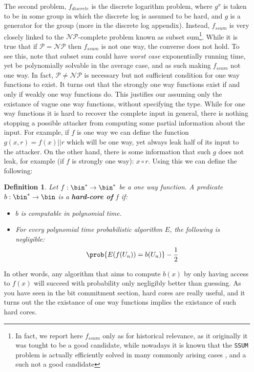 \documentclass{article}
\newtheorem{definition}{Definition}
\begin{document}
The second problem, $f_{discrete}$ is the discrete logarithm problem, where $g^x$ is taken to be in some group in which the discrete log is assumed 
to be hard, and $g$ is a generator for the group (more in the discrete log appendix).
Instead, $f_{ssum}$ is very closely linked to the $\mathcal{NP}$-complete problem known as subset sum\footnote{In fact, we
report here $f_{ssum}$ only as for historical relevance, as it originally it was tought to be a good candidate, while nowadays 
it is known that the \texttt{SSUM} problem is actually efficiently solved in many commonly arising cases \cite{lagariasSolvingLowdensitySubset1985}, and a such
not a good candidate}. 
While it is true that if $\mathcal{P} = \mathcal{NP}$ then $f_{ssum}$ is not one way, the converse does not hold. To see this, note that subset sum could have \textit{worst case} exponentially running time, yet be polynomially solvable in the average case, and as such making $f_{ssum}$ not one way.
In fact, $\mathcal{P} \neq \mathcal{NP}$ is necessary but not sufficient condition for one way functions to exist.
It turns out \cite{goldreichFoundationsCryptographyVol2007} that the strongly one way functions exist if and only if weakly one way functions do. This justifies our assuming only the existance of vague one way functions, without specifying the type.
While for one way functions it is hard to recover the complete input in general, there is nothing stopping a possible attacker from computing some partial information about the input.
For example, if $f$ is one way we can define the function $g(x, r) = f(x) || r$ which will be one way, yet always leak half of its input to the attacker.
On the other hand, there is some information that such $g$ does not leak, for example (if $f$ is strongly one way): $x \circ r$. 
Using this we can define the following:
\begin{definition}
    Let $f: \bin^* \to \bin^*$ be a one way function. A predicate $b: \bin^* \to \bin$ is 
    a \textbf{hard-core of} $f$ if:
    \begin{itemize}
        \item $b$ is computable in polynomial time.
        \item For every polynomial time probabilistic algorithm $E$, the following is negligible:
        \[ \prob{E(f(U_n)) = b(U_n)} - \frac{1}{2} \]
    \end{itemize}
\end{definition}
In other words, any algorithm that aims to compute $b(x)$ by only having access to $f(x)$ will succeed with probability
only negligibly better than guessing. As you have seen in the bit commitment section, hard cores are really useful, and it turns out \cite{goldreichFoundationsCryptographyVol2007} the the existance of one way functions implies the existance of such hard cores. 
\end{document}
